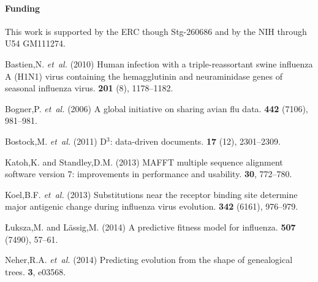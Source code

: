 \documentclass{bioinfo}
\begin{document}
\paragraph{Funding\textcolon}This work is supported by the ERC though Stg-260686 and by the NIH through U54 GM111274.

\begin{thebibliography}{}

Bastien,N. {\em et~al.} (2010{\em{}})
  Human infection with a triple-reassortant swine influenza {A (H1N1)} virus
  containing the hemagglutinin and neuraminidase genes of seasonal influenza
  virus.
 {\bf 201} (8), 1178--1182.

Bogner,P. {\em et~al.} (2006{\em{}}) A global
  initiative on sharing avian flu data.
 {\bf 442} (7106), 981--981.

Bostock,M. {\em et~al.} (2011{\em{}}) D$^3$: data-driven
  documents.
 {\bf 17} (12), 2301--2309.

Katoh,K. and Standley,D.M. (2013{\em{}}) {MAFFT} multiple sequence alignment
  software version 7: improvements in performance and usability.
 {\bf 30}, 772--780.

Koel,B.F. {\em et~al.} (2013{\em{}})
  Substitutions near the receptor binding site determine major antigenic change
  during influenza virus evolution.
 {\bf 342} (6161), 976--979.

\L{}uksza,M. and L\"a{}ssig,M. (2014{\em{}}) A predictive fitness model for
  influenza.
 {\bf 507} (7490), 57--61.

Neher,R.A. {\em et~al.} (2014{\em{}}) Predicting evolution
  from the shape of genealogical trees.
 {\bf 3}, e03568.



\end{thebibliography}
\end{document}
